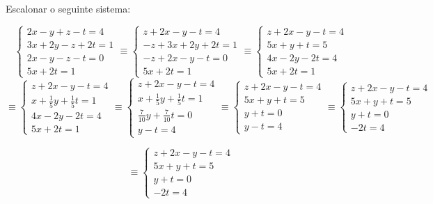 \begin{ex}
	Escalonar o seguinte sistema:

\begin{equation*}
\begin{cases}
2x-y+z-t=4 \\
3x+2y-z+2t=1\\
2x-y-z-t=0\\
5x+2t=1
\end{cases} \equiv \begin{cases}
z+2x-y-t=4 \\
-z+3x+2y+2t=1\\
-z+2x-y-t=0\\
5x+2t=1
\end{cases} \equiv \begin{cases}
z+2x-y-t=4 \\
5x+y+t=5\\
4x-2y-2t=4\\
5x+2t=1
\end{cases}
\end{equation*}
\begin{equation*}
\equiv
\begin{cases}
z+2x-y-t=4 \\
x+\frac{1}{5}y+\frac{1}{5}t=1\\
4x-2y-2t=4\\
5x+2t=1
\end{cases} \equiv \begin{cases}
z+2x-y-t=4 \\
x+\frac{1}{5}y+\frac{1}{5}t=1\\
\frac{7}{10}y+\frac{7}{10}t=0\\
y-t=4
\end{cases} \equiv \begin{cases}
z+2x-y-t=4 \\
5x+y+t=5\\
y+t=0\\
y-t=4
\end{cases}\equiv \begin{cases}
z+2x-y-t=4 \\
5x+y+t=5\\
y+t=0\\
-2t=4
\end{cases}
\end{equation*}

\begin{equation*}
\equiv
\begin{cases}
z+2x-y-t=4 \\
5x+y+t=5\\
y+t=0\\
-2t=4
\end{cases}
\end{equation*}

\end{ex}

